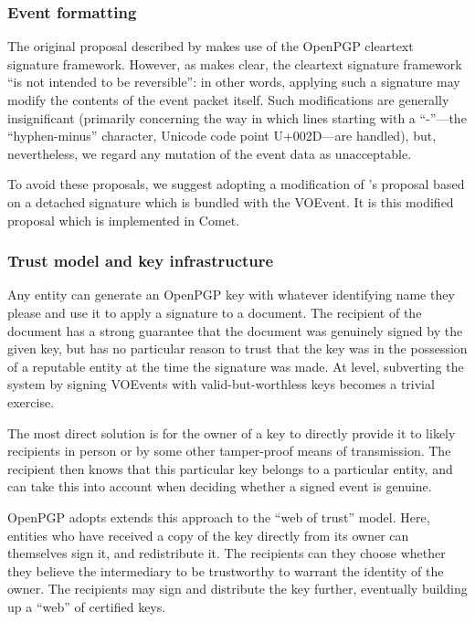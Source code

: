 \documentclass[5p,authoryear]{elsarticle}
\begin{document}
\subsubsection{Event formatting}

The original proposal described by \citet{Denny:2008} makes use of the OpenPGP
cleartext signature framework. However, as \citet[\S7]{Callas:2007} makes clear, the
cleartext signature framework ``is not intended to be reversible'': in other
words, applying such a signature may modify the contents of the event packet
itself. Such modifications are generally insignificant (primarily concerning
the way in which lines starting with a ``-''---the ``hyphen-minus'' character,
Unicode code point U+002D---are handled), but, nevertheless, we regard any
mutation of the event data as unacceptable.

To avoid these proposals, we suggest adopting a modification of
\citeauthor{Denny:2008}'s proposal based on a detached signature
\citep[\S11.4]{Callas:2007} which is bundled with the VOEvent. It is this
modified proposal which is implemented in Comet.

\subsubsection{Trust model and key infrastructure}

Any entity can generate an OpenPGP key with whatever identifying name they
please and use it to apply a signature to a document. The recipient of the
document has a strong guarantee that the document was genuinely signed by the
given key, but has no particular reason to trust that the key was in the
possession of a reputable entity at the time the signature was made. At level,
subverting the system by signing VOEvents with valid-but-worthless keys
becomes a trivial exercise.

The most direct solution is for the owner of a key to directly provide it to
likely recipients in person or by some other tamper-proof means of
transmission. The recipient then knows that this particular key belongs to a
particular entity, and can take this into account when deciding whether a
signed event is genuine.

OpenPGP adopts extends this approach to the ``web of trust'' model. Here,
entities who have received a copy of the key directly from its owner can
themselves sign it, and redistribute it. The recipients can they choose
whether they believe the intermediary to be trustworthy to warrant the identity
of the owner. The recipients may sign and distribute the key further,
eventually building up a ``web'' of certified keys.
\end{document}
